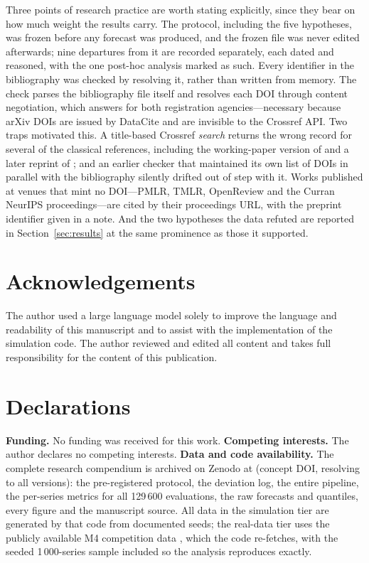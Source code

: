 \documentclass[article]{ajs}
\providecommand{\sectionref}[1]{Section~\ref{#1}}
\begin{document}
Three points of research practice are worth stating explicitly, since they bear on how much
weight the results carry. The protocol, including the five hypotheses, was frozen before any
forecast was produced, and the frozen file was never edited afterwards; nine departures from it
are recorded separately, each dated and reasoned, with the one post-hoc analysis marked as such.
Every identifier in the bibliography was checked by resolving it, rather than written from
memory. The check parses the bibliography file itself and resolves each DOI through
 content negotiation, which answers for both registration agencies---necessary
because arXiv DOIs are issued by DataCite and are invisible to the Crossref API. Two traps
motivated this. A title-based Crossref \emph{search} returns the wrong record for several of the
classical references, including the working-paper version of \citet{diebold1995comparing} and a
later reprint of \citet{hodges1963}; and an earlier checker that maintained its own list of DOIs
in parallel with the bibliography silently drifted out of step with it. Works published at
venues that mint no DOI---PMLR, TMLR, OpenReview and the Curran NeurIPS proceedings---are cited
by their proceedings URL, with the preprint identifier given in a note. And the two hypotheses the data refuted are reported in
\sectionref{sec:results} at the same prominence as those it supported.

\section*{Acknowledgements}

The author used a large language model solely to improve the language and readability of this
manuscript and to assist with the implementation of the simulation code. The author reviewed and
edited all content and takes full responsibility for the content of this publication.

\section*{Declarations}

\textbf{Funding.} No funding was received for this work.
\textbf{Competing interests.} The author declares no competing interests.
\textbf{Data and code availability.} The complete research compendium is archived on Zenodo at
 (concept DOI, resolving to all versions): the pre-registered
protocol, the deviation log, the entire pipeline, the per-series metrics for all 129\,600
evaluations, the raw forecasts and quantiles, every figure and the manuscript source. All data
in the simulation tier are generated by that code from documented seeds; the real-data tier uses
the publicly available M4 competition data \citep{makridakis2020m4}, which the code re-fetches,
with the seeded 1\,000-series sample included so the analysis reproduces exactly.
\end{document}
